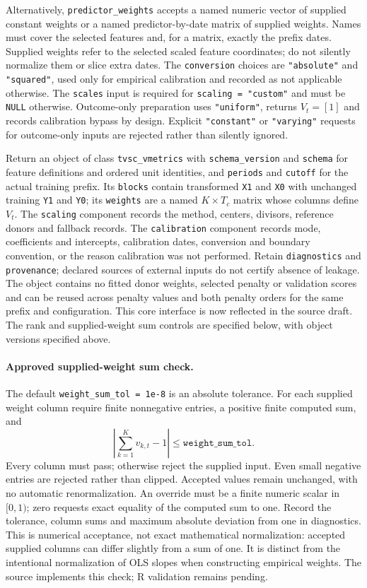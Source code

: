 \documentclass[11pt]{article}
\begin{document}
Alternatively, \texttt{predictor\_weights} accepts a named numeric vector
of supplied constant weights or a named predictor-by-date matrix of
supplied weights. Names must cover the selected features and, for a
matrix, exactly the prefix dates. Supplied weights refer to the selected
scaled feature coordinates; do not silently normalize them or slice extra
dates. The \texttt{conversion} choices are \texttt{"absolute"} and
\texttt{"squared"}, used only for empirical calibration and recorded as
not applicable otherwise. The \texttt{scales} input is required for
\texttt{scaling = "custom"} and must be \texttt{NULL} otherwise.
Outcome-only preparation uses \texttt{"uniform"}, returns $V_t=[1]$ and
records calibration bypass by design. Explicit \texttt{"constant"} or
\texttt{"varying"} requests for outcome-only inputs are rejected rather
than silently ignored.

Return an object of class \texttt{tvsc\_vmetrics} with
\texttt{schema\_version} and \texttt{schema} for feature definitions and
ordered unit identities, and \texttt{periods} and \texttt{cutoff} for the
actual training prefix. Its \texttt{blocks} contain transformed
\texttt{X1} and \texttt{X0} with unchanged training \texttt{Y1} and
\texttt{Y0}; its \texttt{weights} are a named $K\times T_c$ matrix whose
columns define $V_t$. The \texttt{scaling} component records the method,
centers, divisors, reference donors and fallback records. The
\texttt{calibration} component records mode, coefficients and intercepts,
calibration dates, conversion and boundary convention, or the reason
calibration was not performed. Retain \texttt{diagnostics} and
\texttt{provenance}; declared sources of external inputs do not certify
absence of leakage. The object contains no fitted donor weights, selected
penalty or validation scores and can be reused across penalty values and
both penalty orders for the same prefix and configuration. This core
interface is now reflected in the source draft. The rank and supplied-weight
sum controls are specified below, with object versions specified above.

\paragraph{Approved supplied-weight sum check.}
The default \texttt{weight\_sum\_tol = 1e-8} is an absolute tolerance.
For each supplied weight column require finite nonnegative entries, a
positive finite computed sum, and
\[
 \left|\sum_{k=1}^K v_{k,t}-1\right|
 \leq \texttt{weight\_sum\_tol}.
\]
Every column must pass; otherwise reject the supplied input. Even small
negative entries are rejected rather than clipped. Accepted values remain
unchanged, with no automatic renormalization. An override must be a finite
numeric scalar in $[0,1)$; zero requests exact equality of the computed
sum to one. Record the tolerance, column sums and maximum absolute
deviation from one in diagnostics. This is numerical acceptance, not
exact mathematical normalization: accepted supplied columns can differ
slightly from a sum of one. It is distinct from the intentional
normalization of OLS slopes when constructing empirical weights.
The source implements this check; R validation remains pending.
\end{document}
